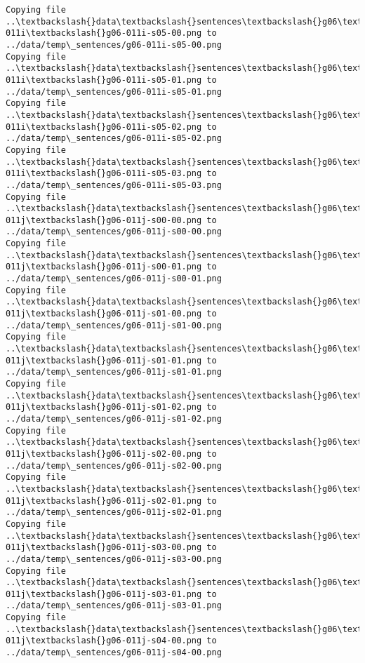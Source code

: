 \documentclass[11pt]{article}
\begin{document}
\begin{Verbatim}[commandchars=\\\{\}]
Copying file ..\textbackslash{}data\textbackslash{}sentences\textbackslash{}g06\textbackslash{}g06-011i\textbackslash{}g06-011i-s05-00.png to
../data/temp\_sentences/g06-011i-s05-00.png
Copying file ..\textbackslash{}data\textbackslash{}sentences\textbackslash{}g06\textbackslash{}g06-011i\textbackslash{}g06-011i-s05-01.png to
../data/temp\_sentences/g06-011i-s05-01.png
Copying file ..\textbackslash{}data\textbackslash{}sentences\textbackslash{}g06\textbackslash{}g06-011i\textbackslash{}g06-011i-s05-02.png to
../data/temp\_sentences/g06-011i-s05-02.png
Copying file ..\textbackslash{}data\textbackslash{}sentences\textbackslash{}g06\textbackslash{}g06-011i\textbackslash{}g06-011i-s05-03.png to
../data/temp\_sentences/g06-011i-s05-03.png
Copying file ..\textbackslash{}data\textbackslash{}sentences\textbackslash{}g06\textbackslash{}g06-011j\textbackslash{}g06-011j-s00-00.png to
../data/temp\_sentences/g06-011j-s00-00.png
Copying file ..\textbackslash{}data\textbackslash{}sentences\textbackslash{}g06\textbackslash{}g06-011j\textbackslash{}g06-011j-s00-01.png to
../data/temp\_sentences/g06-011j-s00-01.png
Copying file ..\textbackslash{}data\textbackslash{}sentences\textbackslash{}g06\textbackslash{}g06-011j\textbackslash{}g06-011j-s01-00.png to
../data/temp\_sentences/g06-011j-s01-00.png
Copying file ..\textbackslash{}data\textbackslash{}sentences\textbackslash{}g06\textbackslash{}g06-011j\textbackslash{}g06-011j-s01-01.png to
../data/temp\_sentences/g06-011j-s01-01.png
Copying file ..\textbackslash{}data\textbackslash{}sentences\textbackslash{}g06\textbackslash{}g06-011j\textbackslash{}g06-011j-s01-02.png to
../data/temp\_sentences/g06-011j-s01-02.png
Copying file ..\textbackslash{}data\textbackslash{}sentences\textbackslash{}g06\textbackslash{}g06-011j\textbackslash{}g06-011j-s02-00.png to
../data/temp\_sentences/g06-011j-s02-00.png
Copying file ..\textbackslash{}data\textbackslash{}sentences\textbackslash{}g06\textbackslash{}g06-011j\textbackslash{}g06-011j-s02-01.png to
../data/temp\_sentences/g06-011j-s02-01.png
Copying file ..\textbackslash{}data\textbackslash{}sentences\textbackslash{}g06\textbackslash{}g06-011j\textbackslash{}g06-011j-s03-00.png to
../data/temp\_sentences/g06-011j-s03-00.png
Copying file ..\textbackslash{}data\textbackslash{}sentences\textbackslash{}g06\textbackslash{}g06-011j\textbackslash{}g06-011j-s03-01.png to
../data/temp\_sentences/g06-011j-s03-01.png
Copying file ..\textbackslash{}data\textbackslash{}sentences\textbackslash{}g06\textbackslash{}g06-011j\textbackslash{}g06-011j-s04-00.png to
../data/temp\_sentences/g06-011j-s04-00.png

\end{Verbatim}
\end{document}
